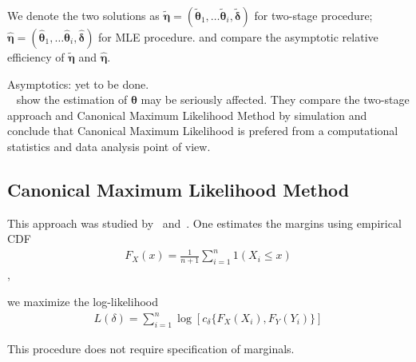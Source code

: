 We denote the two solutions as
$\tilde{\pmb{\eta}} = (\pmb{\tilde{\theta}}_1,\dots \pmb{\tilde{\theta}}_i, \pmb{\tilde{\delta}})$ for two-stage procedure;
$\hat{\pmb{\eta}} =(\pmb{\hat{\theta}}_1,\dots \pmb{\hat{\theta}}_i, \pmb{\hat{\delta}})$ for MLE procedure.
and compare the asymptotic relative efficiency of $\tilde{\pmb{\eta}}$ and $\hat{\pmb{\eta}}$.

Asymptotics: yet to be done.\\
~\cite{kim2007comparison} show the estimation of $\pmb{\theta}$ may be seriously affected.
They compare the two-stage approach and Canonical Maximum Likelihood Method by simulation and
conclude that Canonical Maximum Likelihood is prefered from a computational statistics and data analysis point of view.

\subsection{Canonical Maximum Likelihood Method}\label{subsec:canonical-maximum-likelihood-method}
This approach was studied by~\cite{genest1995semiparametric} and~\cite{shih1995inferences}.
One estimates the margins using empirical CDF
\begin{align}F_X(x)=\frac{1}{n+1}\sum_{i=1}^n 1(X_i \leq x)\end{align},

we maximize the log-likelihood
\begin{align}
    L(\delta) = \sum_{i=1}^n \log [c_\delta \{F_X(X_i), F_Y(Y_i)\}]
    \end{align}

This procedure does not require specification of marginals.





%
%
%

